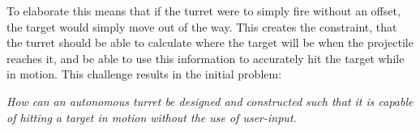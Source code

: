 To elaborate this means that if the turret were to simply fire without an
offset, the target would simply move out of the way. This creates the
constraint, that the turret should be able to calculate where the target will be
when the projectile reaches it, and be able to use this information to
accurately hit the target while in motion. This challenge results in the initial
problem:

\begin{center}
\begin{minipage}{0.8\linewidth}
\textit{How can an autonomous turret be designed and constructed such that it is
capable of hitting a target in motion without the use of user-input.}
\end{minipage}
\end{center} 

